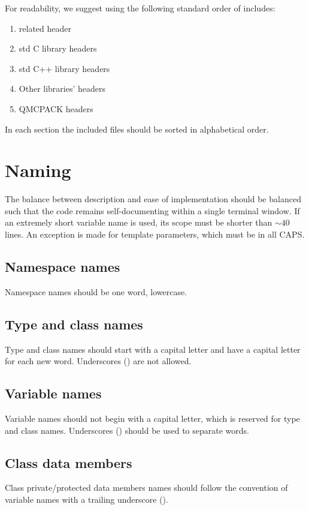 For readability, we suggest using the following standard order of includes:
\begin{enumerate}
	\item related header
	\item std C library headers
	\item std C++ library headers
	\item Other libraries' headers
	\item QMCPACK headers
\end{enumerate}

In each section the included files should be sorted in alphabetical order.

\section{Naming}
The balance between description and ease of implementation should be balanced such that the code remains self-documenting within a single terminal window.  If an extremely short variable name is used, its scope must be shorter than $\sim 40$ lines. An exception is made for template parameters, which must be in all CAPS.

\subsection{Namespace names}
Namespace names should be one word, lowercase.

\subsection{Type and class names}
Type and class names should start with a capital letter and have a capital letter for each new word.
Underscores (\inlinecode{_}) are not allowed. 

\subsection{Variable names}
Variable names should not begin with a capital letter, which is reserved for type and class names. Underscores (\inlinecode{_}) should be used to separate words.

\subsection{Class data members}
Class private/protected data members names should follow the convention of variable names with a trailing underscore (\inlinecode{_}).


